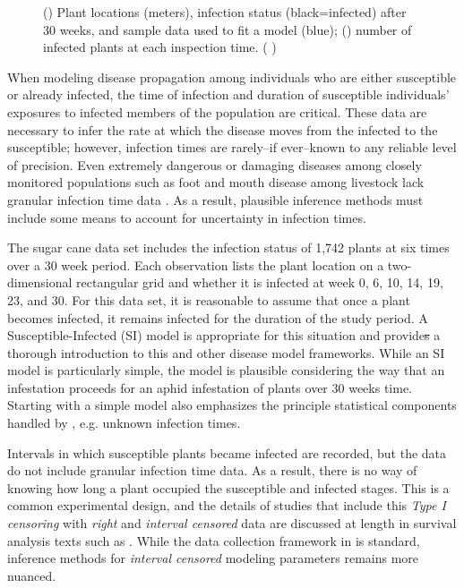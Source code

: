 \documentclass{uwstat572}
\newcommand{\vmdel}[1]{\sout{#1}}
\newcommand{\vmcomment}[1]{({\color{blue}{VM's comment:}} \textbf{\color{blue}{#1}})}
\begin{document}
\begin{figure}[h]
\begin{subfigure}[b]{0.49\textwidth}
		\caption{}
		\label{fig:cum_infection}
	\end{subfigure}
	\caption{() Plant locations (meters), infection status (black=infected) after 30 weeks, and sample data used to fit a model (blue); () number of infected plants at each inspection time. 
	\vmcomment{Explain the blue box here?}}
	\label{fig:data_plot}
\end{figure} 

When modeling disease propagation among individuals who are either susceptible or already infected, the time of infection and duration of susceptible individuals' exposures to infected members of the population are critical. 
These data are necessary to infer the rate at which the disease moves from the infected to the susceptible; however, infection times are rarely--if ever--known to any reliable level of precision. 
Even extremely dangerous or damaging diseases among closely monitored populations such as foot and mouth disease among livestock lack granular infection time data \citep{Diggle, Deardon}. 
As a result, plausible inference methods must include some means to account for uncertainty in infection times. 

The sugar cane data set includes the infection status of 1,742 plants at six times over a 30 week period. 
Each observation lists the plant location on a two-dimensional rectangular grid and whether it is infected at week 0, 6, 10, 14, 19, 23, and 30.
For this data set, it is reasonable to assume that once a plant becomes infected, it remains infected for the duration of the study period. 
A Susceptible-Infected (SI) model is appropriate for this situation and \citet{Jewell} provide\vmdel{s} a thorough introduction to this and other disease model frameworks. 
While an SI model is particularly simple, the model is plausible considering the way that an infestation proceeds for an aphid infestation of plants over 30 weeks time. 
Starting with a simple model also emphasizes the principle statistical components handled by \citet{Brown}, e.g. unknown infection times. 

Intervals in which susceptible plants became infected are recorded, but the data do not include granular infection time data.  
As a result, there is no way of knowing how long a plant occupied the susceptible and infected stages.
This is a common experimental design, and the details of studies that include this \textit{Type I censoring} with \textit{right} and \textit{interval censored} data are discussed at length in survival analysis texts such as \citep{Klein}. 
While the data collection framework in \citep{Brown} is standard, inference methods for \textit{interval censored} modeling parameters remains more nuanced.
\end{document}
